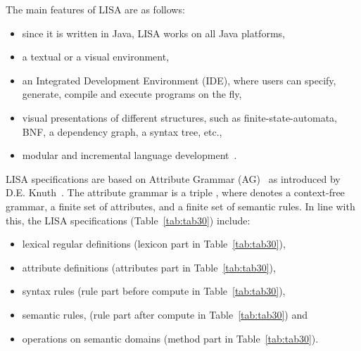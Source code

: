 \documentclass[preprint, prX]{revtex4}
\begin{document}
The main features of LISA are as follows:
\begin{itemize}
 \item since it is written in Java, LISA works on all Java platforms,
 \item a textual or a visual environment,
 \item an Integrated Development Environment (IDE), where users can specify, generate, compile and execute programs on the fly,
 \item visual presentations of different structures, such as finite-state-automata, BNF, a dependency graph, a syntax tree, etc.,
 \item modular and incremental language development~\cite{Mernik:2005a}.
\end{itemize}
LISA specifications are based on Attribute Grammar (AG)~\cite{Paakki:1995} as introduced by D.E. Knuth~\cite{Knuth:1968}.
The attribute grammar is a triple , where  denotes a context-free grammar,  a finite set of attributes,
and  a finite set of semantic rules. In line with this, the LISA specifications (Table~\ref{tab:tab30}) include:
\begin{itemize}
  \item lexical regular definitions (lexicon part in Table~\ref{tab:tab30}),
  \item attribute definitions (attributes part in Table~\ref{tab:tab30}),
  \item syntax rules (rule part before compute in Table~\ref{tab:tab30}),
  \item semantic rules, (rule part after compute in Table~\ref{tab:tab30}) and
  \item operations on semantic domains (method part in Table~\ref{tab:tab30}).
\end{itemize}
\end{document}
